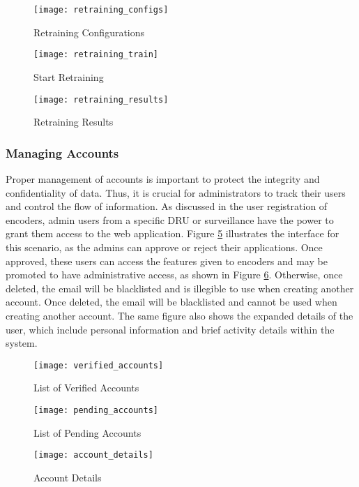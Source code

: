 \begin{figure}[H]
	\centering
	\texttt{[image: retraining\_configs]}
	\caption{Retraining Configurations}
	\label{fig:retraining_configs}
\end{figure}
\begin{figure}[H]
	\centering
	\texttt{[image: retraining\_train]}
	\caption{Start Retraining}
	\label{fig:retraining_train}
\end{figure}
\begin{figure}[H]
	\centering
	\texttt{[image: retraining\_results]}
	\caption{Retraining Results}
	\label{fig:retraining_results}
\end{figure}

\clearpage

\subsubsection{Managing Accounts}

Proper management of accounts is important to protect the integrity and confidentiality of data. Thus, it is crucial for administrators to track their users and control the flow of information. As discussed in the user registration of encoders, admin users from a specific DRU or surveillance have the power to grant them access to the web application. Figure \ref{fig:pending_accounts} illustrates the interface for this scenario, as the admins can approve or reject their applications. Once approved, these users can access the features given to encoders and may be promoted to have administrative access, as shown in Figure \ref{fig:account_details}. Otherwise, once deleted, the email will be blacklisted and is illegible to use when creating another account. Once deleted, the email will be blacklisted and cannot be used when creating another account. The same figure also shows the expanded details of the user, which include personal information and brief activity details within the system.

\begin{figure}[H]
	\centering
	\texttt{[image: verified\_accounts]}
	\caption{List of Verified Accounts}
	\label{fig:verified_accounts}
\end{figure}
\begin{figure}[H]
	\centering
	\texttt{[image: pending\_accounts]}
	\caption{List of Pending Accounts}
	\label{fig:pending_accounts}
\end{figure}
\begin{figure}[H]
	\centering
	\texttt{[image: account\_details]}
	\caption{Account Details}
	\label{fig:account_details}
\end{figure}

